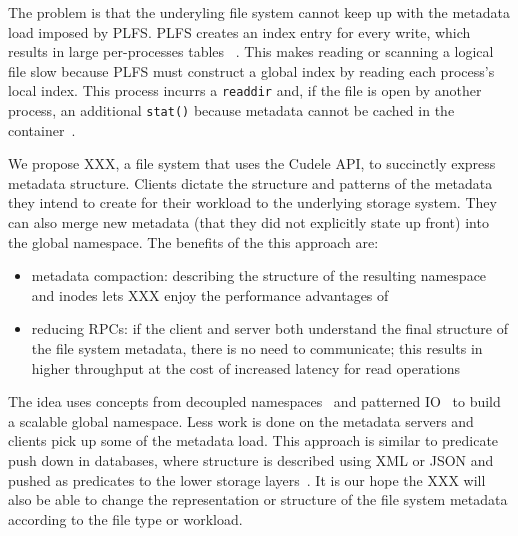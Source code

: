  
The problem is that the underyling file system cannot keep up with the metadata
load imposed by PLFS. PLFS creates an index entry for every write, which
results in large per-processes tables ~\cite{grider:pc17-diddlings}. This makes
reading or scanning a logical file slow because PLFS must construct a global
index by reading each process's local index. This process incurrs a
\texttt{readdir} and, if the file is open by another process, an additional
\texttt{stat()} because metadata cannot be cached in the
container~\cite{bent_plfs_2009}.

We propose XXX, a file system that uses the Cudele API, to succinctly express
metadata structure. Clients dictate the structure and patterns of the metadata
they intend to create for their workload to the underlying storage system. They
can also merge new metadata (that they did not explicitly state up front) into
the global namespace.  The benefits of the this approach are:

\begin{itemize}

  \item metadata compaction: describing the structure of the resulting
  namespace and inodes lets XXX enjoy the performance advantages
  of~\cite{he:hpdc13-plfs-patterns}

  \item reducing RPCs: if the client and server both understand the final
  structure of the file system metadata, there is no need to communicate; this
  results in higher throughput at the cost of increased latency for read operations

\end{itemize}

The idea uses concepts from decoupled namespaces~\cite{zheng:pdsw2014-batchfs,
zheng:pdsw2015-deltafs} and patterned IO~\cite{he:hpdc13-plfs-patterns} to
build a scalable global namespace. Less work is done on the metadata servers
and clients pick up some of the metadata load.  This approach is similar to
predicate push down in databases, where structure is described using XML or
JSON and pushed as predicates to the lower storage
layers~\cite{shel:pc17-pushdown}. It is our hope the XXX will also be able to
change the representation or structure of the file system metadata according to
the file type or workload.

